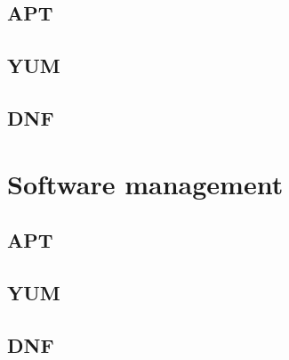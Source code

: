 \documentclass[a4paper,12pt,twoside,openright,titlepage]{book}
\begin{document}
\subsection{APT}

\subsection{YUM}

\subsection{DNF}

\section{Software management}

\subsection{APT}

\subsection{YUM}

\subsection{DNF}

\end{document}

